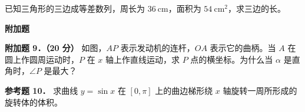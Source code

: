 \begin{question}
已知三角形的三边成等差数列，周长为 $36\ \mathrm{cm}$，面积为 $54\ \mathrm{cm^2}$，求三边的长。

\begin{gktip}
\Needspace{0.25\textheight}
\textbf{附加题}
\end{gktip}

\textbf{附加题 9．（20 分）} 如图，$AP$ 表示发动机的连杆，$OA$ 表示它的曲柄。当 $A$ 在圆上作圆周运动时，$P$ 在 $x$ 轴上作直线运动，求 $P$ 点的横坐标。为什么当 $\alpha$ 是直角时，$\angle P$ 是最大？
\nopagebreak[4]
\begin{center}\end{center}
\nopagebreak[4]
\textbf{参考题 10．} 求曲线 $y=\sin x$ 在 $[0,\pi]$ 上的曲边梯形绕 $x$ 轴旋转一周所形成的旋转体的体积。

\end{question}